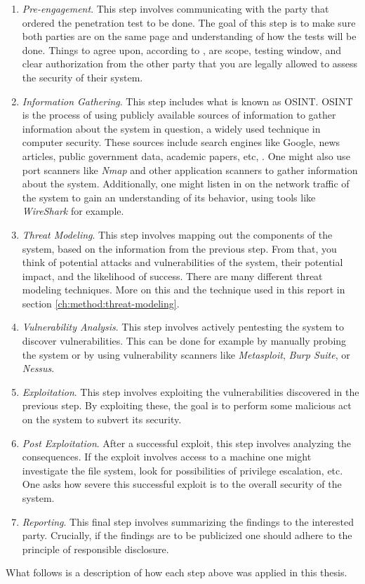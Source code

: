 \begin{enumerate}
    \item \textit{Pre-engagement}. This step involves communicating with the party that ordered the penetration test to be done. The goal of this step is to make sure both parties are on the same page and understanding of how the tests will be done. Things to agree upon, according to \citeauthor{weidman2014}, are scope, testing window, and clear authorization from the other party that you are legally allowed to assess the security of their system.
    \item \textit{Information Gathering}. This step includes what is known as \gls{OSINT}. \gls{OSINT} is the process of using publicly available sources of information to gather information about the system in question, a widely used technique in computer security. These sources include search engines like Google, news articles, public government data, academic papers, etc, \cite{steele2007open}. One might also use port scanners like \textit{Nmap} and other application scanners to gather information about the system. Additionally, one might listen in on the network traffic of the system to gain an understanding of its behavior, using tools like \textit{WireShark} for example.
    \item \textit{Threat Modeling}. This step involves mapping out the components of the system, based on the information from the previous step. From that, you think of potential attacks and vulnerabilities of the system, their potential impact, and the likelihood of success. There are many different threat modeling techniques. More on this and the technique used in this report in section \ref{ch:method:threat-modeling}.
    \item \textit{Vulnerability Analysis}. This step involves actively pentesting the system to discover vulnerabilities. This can be done for example by manually probing the system or by using vulnerability scanners like \textit{Metasploit}, \textit{Burp Suite}, or \textit{Nessus}.
    \item \textit{Exploitation}. This step involves exploiting the vulnerabilities discovered in the previous step. By exploiting these, the goal is to perform some malicious act on the system to subvert its security.
    \item \textit{Post Exploitation}. After a successful exploit, this step involves analyzing the consequences. If the exploit involves access to a machine one might investigate the file system, look for possibilities of privilege escalation, etc. One asks how severe this successful exploit is to the overall security of the system.
    \item \textit{Reporting}. This final step involves summarizing the findings to the interested party. Crucially, if the findings are to be publicized one should adhere to the principle of responsible disclosure.
\end{enumerate}
What follows is a description of how each step above was applied in this thesis.

